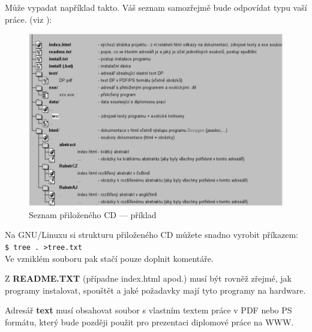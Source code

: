 \documentclass[11pt,twoside,a4paper]{book}
\begin{document}
Může vypadat například takto. Váš seznam samozřejmě bude odpovídat typu vaší práce. (viz \cite{infodp}):

\begin{figure}[h]
\begin{center}
\includegraphics[width=14cm]{figures/seznamcd}
\caption{Seznam přiloženého CD --- příklad}
\label{fig:seznamcd}
\end{center}
\end{figure}

Na GNU/Linuxu si strukturu přiloženého CD můžete snadno vyrobit příkazem:\\ 
\verb|$ tree . >tree.txt|\\
Ve vzniklém souboru pak stačí pouze doplnit komentáře.

Z \textbf{README.TXT} (případne index.html apod.)  musí být rovněž zřejmé, jak programy instalovat, spouštět a jaké požadavky mají tyto programy na hardware.

Adresář \textbf{text}  musí obsahovat soubor s vlastním textem práce v PDF nebo PS formátu, který bude později použit pro prezentaci diplomové práce na WWW.
\end{document}
